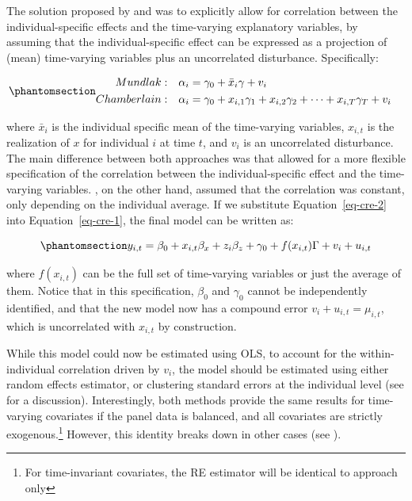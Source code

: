 \documentclass[bib]{statapress}
\begin{document}
The solution proposed by \citet{mundlak1978pooling} and
\citet{chamberlain1982multivariate} was to explicitly allow for
correlation between the individual-specific effects and the time-varying
explanatory variables, by assuming that the individual-specific effect
can be expressed as a projection of (mean) time-varying variables plus
an uncorrelated disturbance. Specifically:

\begin{equation}\phantomsection\label{eq-cre-2}{\begin{aligned}
Mundlak:  & & \alpha_i &= \gamma_0 + \bar x_{i}\gamma + v_i &  \\
Chamberlain: & & \alpha_i &= \gamma_0 + x_{i,1}\gamma_1 + x_{i,2}\gamma_2 + \dots + x_{i,T}\gamma_T + v_i 
\end{aligned}
}\end{equation}

where \(\bar x_{i}\) is the individual specific mean of the time-varying
variables, \(x_{i,t}\) is the realization of \(x\) for individual \(i\)
at time \(t\), and \(v_i\) is an uncorrelated disturbance. The main
difference between both approaches was that
\citet{chamberlain1982multivariate} allowed for a more flexible
specification of the correlation between the individual-specific effect
and the time-varying variables. \citet{mundlak1978pooling}, on the other
hand, assumed that the correlation was constant, only depending on the
individual average. If we substitute Equation~\ref{eq-cre-2} into
Equation~\ref{eq-cre-1}, the final model can be written as:

\begin{equation}\phantomsection\label{eq-cre-final}{y_{i,t} = \beta_0 +x_{i,t}\beta_x + z_{i}\beta_z + \gamma_0 + f(x_{i,t})\Gamma + v_i + u_{i,t}
}\end{equation}

where \(f(x_{i,t})\) can be the full set of time-varying variables or
just the average of them. Notice that in this specification, \(\beta_0\)
and \(\gamma_0\) cannot be independently identified, and that the new
model now has a compound error \(v_i + u_{i,t}=\mu_{i,t}\), which is
uncorrelated with \(x_{i,t}\) by construction.

While this model could now be estimated using OLS, to account for the
within-individual correlation driven by \(v_i\), the model should be
estimated using either random effects estimator, or clustering standard
errors at the individual level (see \citet{wooldridge2010econometric}
for a discussion). Interestingly, both methods provide the same results
for time-varying covariates if the panel data is balanced, and all
covariates are strictly exogenous.\footnote{For time-invariant
  covariates, the RE estimator will be identical to
  \citet{chamberlain1982multivariate} approach only} However, this
identity breaks down in other cases (see \citet{abrevaya2013}).
\end{document}
